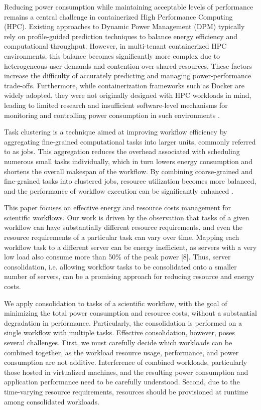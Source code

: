 Reducing power consumption while maintaining acceptable levels of performance remains a central challenge in containerized High Performance Computing (HPC). Existing approaches to Dynamic Power Management (DPM) typically rely on profile-guided prediction techniques to balance energy efficiency and computational throughput. However, in multi-tenant containerized HPC environments, this balance becomes significantly more complex due to heterogeneous user demands and contention over shared resources. These factors increase the difficulty of accurately predicting and managing power-performance trade-offs. Furthermore, while containerization frameworks such as Docker are widely adopted, they were not originally designed with HPC workloads in mind, leading to limited research and insufficient software-level mechanisms for monitoring and controlling power consumption in such environments \cite{Kuity_2023}.

Task clustering is a technique aimed at improving workflow efficiency by aggregating fine-grained computational tasks into larger units, commonly referred to as jobs. This aggregation reduces the overhead associated with scheduling numerous small tasks individually, which in turn lowers energy consumption and shortens the overall makespan of the workflow. By combining coarse-grained and fine-grained tasks into clustered jobs, resource utilization becomes more balanced, and the performance of workflow execution can be significantly enhanced \cite{Saadi_2023}.

This paper focuses on effective energy and resource costs management for scientific workflows. Our work is driven by the observation that tasks of a given workflow can have substantially different resource requirements, and even the resource requirements of a particular task can vary over time. Mapping each workflow task to a different server can be energy inefficient, as servers with a very low load also consume more than 50\% of the peak power [8]. Thus, server consolidation, i.e. allowing workflow tasks to be consolidated onto a smaller number of servers, can be a promising approach for reducing resource and energy costs.

We apply consolidation to tasks of a scientific workflow, with the goal of minimizing the total power consumption and resource costs, without a substantial degradation in performance. Particularly, the consolidation is performed on a single workflow with multiple tasks. Effective consolidation, however, poses several challenges. First, we must carefully decide which workloads can be combined together, as the workload resource usage, performance, and power consumption are not additive. Interference of combined workloads, particularly those hosted in virtualized machines, and the resulting power consumption and application performance need to be carefully understood. Second, due to the time-varying resource requirements, resources should be provisioned at runtime among consolidated workloads.

